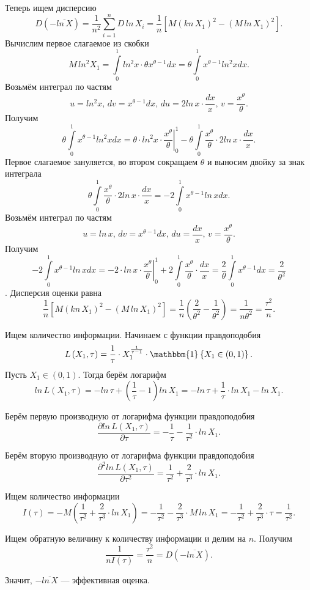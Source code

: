 Теперь ищем дисперсию
$$D \left( - \overline{ln \, X} \right) =
  \frac{1}{n^2} \sum \limits_{i = 1}^n D \, ln \, X_i =
  \frac{1}{n} \left[ M \left( kn \, X_1 \right)^2 - \left( M \, ln \, X_1 \right)^2 \right].$$
Вычислим первое слагаемое из скобки
$$M \, ln^2 X_1 =
  \int \limits_0^1 ln^2 x \cdot \theta x^{ \theta - 1} dx =
  \theta \int \limits_0^1 x^{ \theta - 1} ln^2 xdx.$$
Возьмём интеграл по частям
$$u = ln^2 x, \,
  dv = x^{ \theta - 1} dx, \,
  du = 2ln \, x \cdot \frac{dx}{x}, \,
  v = \frac{x^{ \theta }}{ \theta }.$$
Получим
$$ \theta \int \limits_0^1 x^{ \theta - 1} ln^2 xdx =
  \theta \cdot \left. ln^2 x \cdot \frac{x^{ \theta }}{ \theta } \right|_0^1 -
  \theta \int \limits_0^1 \frac{x^{ \theta }}{ \theta } \cdot 2ln \, x \cdot \frac{dx}{x}.$$
Первое слагаемое зануляется, во втором сокращаем $ \theta $ и выносим двойку за знак интеграла
$$ \theta \int \limits_0^1 \frac{x^{ \theta }}{ \theta } \cdot 2ln \, x \cdot \frac{dx}{x} =
  -2 \int \limits_0^1 x^{ \theta - 1} ln \, xdx.$$
Возьмём интеграл по частям
$$u = ln \, x, \,
  dv = x^{ \theta - 1} dx, \,
  du = \frac{dx}{x}, \,
  v = \frac{x^{ \theta }}{ \theta }.$$
Получим
$$-2 \int \limits_0^1 x^{ \theta - 1} ln \, xdx =
  -2 \cdot \left. ln \, x \cdot \frac{x^{ \theta }}{ \theta } \right|_0^1 +
  2 \int \limits_0^1 \frac{x^{ \theta }}{ \theta } \cdot \frac{dx}{x} =
  \frac{2}{ \theta } \int \limits_0^1 x^{ \theta - 1} dx =
  \frac{2}{ \theta^2}$$.
Дисперсия оценки равна
$$ \frac{1}{n} \left[ M \left( kn \, X_1 \right)^2 - \left( M \, ln \, X_1 \right)^2 \right] =
  \frac{1}{n} \left( \frac{2}{ \theta^2} - \frac{1}{ \theta^2} \right) =
  \frac{1}{n \theta^2} =
  \frac{ \tau^2}{n}.$$

Ищем количество информации. Начинаем с функции правдоподобия
$$L \left( X_1, \tau \right) =
  \frac{1}{ \tau } \cdot X_1^{ \frac{1}{ \tau - 1}} \cdot
  \mathbbm{1} \left\{ X_1 \in \left( 0, 1 \right) \right\}.$$
Пусть $X_1 \in \left( 0, 1 \right) $.
Тогда берём логарифм
$$ln \, L \left( X_1, \tau \right) =
  -ln \, \tau + \left( \frac{1}{ \tau } - 1 \right) ln \, X_1 =
  -ln \, \tau + \frac{1}{ \tau } \cdot ln \, X_1 - ln \, X_1.$$

Берём первую производную от логарифма функции правдоподобия
$$ \frac{ \partial ln \, L \left( X_1, \tau \right) }{ \partial \tau } =
  - \frac{1}{ \tau } - \frac{1}{ \tau^2} \cdot ln \, X_1.$$

Берём вторую производную от логарифма функции правдоподобия
$$ \frac{ \partial^2 ln \, L \left( X_1, \tau \right) }{ \partial \tau^2} =
  \frac{1}{ \tau^2} + \frac{2}{ \tau^3} \cdot ln \, X_1.$$

Ищем количество информации
$$I \left( \tau \right) =
  -M \left( \frac{1}{ \tau^2} + \frac{2}{ \tau^3} \cdot ln \, X_1 \right) =
  - \frac{1}{ \tau^2} - \frac{2}{ \tau^3} \cdot M \, ln \, X_1 =
  - \frac{1}{ \tau^2} + \frac{2}{ \tau^3} \cdot \tau =
  \frac{1}{ \tau^2}.$$

Ищем обратную величину к количеству информации и делим на $n$.
Получим
$$ \frac{1}{nI \left( \tau \right) } =
  \frac{ \tau^2}{n} =
  D \left( - \overline{ln \, X} \right).$$

Значит, $- \overline{ln \, X}$ --- эффективная оценка.
